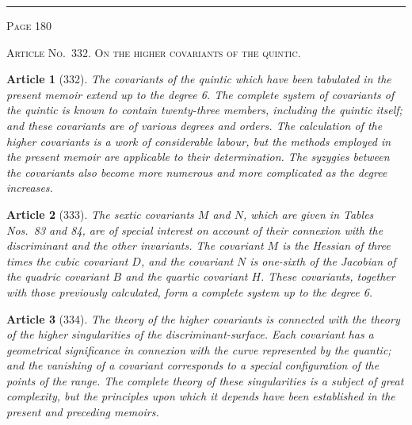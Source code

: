 \documentclass[11pt,a4paper]{article}
\theoremstyle{cayley}
\newtheorem{art}{Article}
\begin{document}
\vspace{1em}
\noindent\rule{\textwidth}{0.4pt}
\begin{center}\textsc{Page 180}\end{center}
\newpage

\begin{center}
\textsc{Article No.\ 332. On the higher covariants of the quintic.}
\end{center}

\begin{art}[332]
The covariants of the quintic which have been tabulated in the present memoir extend up to the degree 6. The complete system of covariants of the quintic is known to contain twenty-three members, including the quintic itself; and these covariants are of various degrees and orders. The calculation of the higher covariants is a work of considerable labour, but the methods employed in the present memoir are applicable to their determination. The syzygies between the covariants also become more numerous and more complicated as the degree increases.
\end{art}

\begin{art}[333]
The sextic covariants $M$ and $N$, which are given in Tables Nos.~83 and 84, are of special interest on account of their connexion with the discriminant and the other invariants. The covariant $M$ is the Hessian of three times the cubic covariant $D$, and the covariant $N$ is one-sixth of the Jacobian of the quadric covariant $B$ and the quartic covariant $H$. These covariants, together with those previously calculated, form a complete system up to the degree 6.
\end{art}

\begin{art}[334]
The theory of the higher covariants is connected with the theory of the higher singularities of the discriminant-surface. Each covariant has a geometrical significance in connexion with the curve represented by the quantic; and the vanishing of a covariant corresponds to a special configuration of the points of the range. The complete theory of these singularities is a subject of great complexity, but the principles upon which it depends have been established in the present and preceding memoirs.
\end{art}
\end{document}

